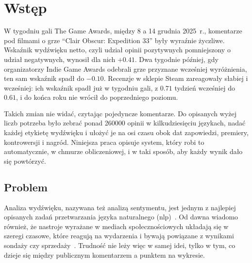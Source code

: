 \chapter{Wstęp}
\label{chap:introduction}


W tygodniu gali The Game Awards, między 8 a 14 grudnia 2025~r., komentarze pod filmami o grze \enquote{Clair Obscur: Expedition 33} były wyraźnie życzliwe.
Wskaźnik wydźwięku netto, czyli udział opinii pozytywnych pomniejszony o udział negatywnych, wynosił dla nich $+\num{0.41}$.
Dwa tygodnie później, gdy organizatorzy Indie Game Awards odebrali grze przyznane wcześniej wyróżnienia, ten sam wskaźnik spadł do $-\num{0.10}$.
Recenzje w sklepie Steam zareagowały słabiej i wcześniej: ich wskaźnik spadł już w tygodniu gali, z $\num{0.71}$ tydzień wcześniej do $\num{0.61}$, i do końca roku nie wrócił do poprzedniego poziomu.

Takich zmian nie widać, czytając pojedyncze komentarze.
Do opisanych wyżej liczb potrzeba było zebrać ponad \num{260000} opinii w kilkudziesięciu językach, nadać każdej etykietę wydźwięku i ułożyć je na osi czasu obok dat zapowiedzi, premiery, kontrowersji i nagród.
Niniejsza praca opisuje system, który robi to automatycznie, w chmurze obliczeniowej, i w taki sposób, aby każdy wynik dało się powtórzyć.

\section{Problem}
\label{sec:intro-problem}

Analiza wydźwięku, nazywana też analizą sentymentu, jest jednym z najlepiej opisanych zadań przetwarzania języka naturalnego (\ac{nlp})~\cite{pang2008opinion,liu2015sentiment}.
Od dawna wiadomo również, że nastroje wyrażane w mediach społecznościowych układają się w szeregi czasowe, które reagują na wydarzenia i bywają powiązane z wynikami sondaży czy sprzedaży~\cite{oconnor2010tweets,asur2010predicting,thelwall2011sentiment}.
Trudność nie leży więc w samej idei, tylko w tym, co dzieje się między publicznym komentarzem a punktem na wykresie.

